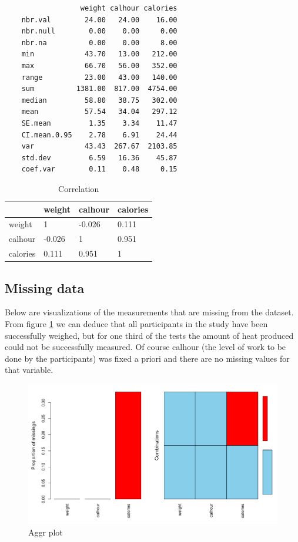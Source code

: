 \documentclass[11pt, a4paper]{article}
\begin{document}
\begin{verbatim}
                  weight calhour calories
    nbr.val        24.00   24.00    16.00
    nbr.null        0.00    0.00     0.00
    nbr.na          0.00    0.00     8.00
    min            43.70   13.00   212.00
    max            66.70   56.00   352.00
    range          23.00   43.00   140.00
    sum          1381.00  817.00  4754.00
    median         58.80   38.75   302.00
    mean           57.54   34.04   297.12
    SE.mean         1.35    3.34    11.47
    CI.mean.0.95    2.78    6.91    24.44
    var            43.43  267.67  2103.85
    std.dev         6.59   16.36    45.87
    coef.var        0.11    0.48     0.15
\end{verbatim}


\begin{table}[H]
    \centering
    \begin{tabular}{l|l|l|l|}
    \cline{2-4}
                                   & weight & calhour & calories \\ \hline
    \multicolumn{1}{|l|}{weight}   & 1      & -0.026  & 0.111    \\ \hline
    \multicolumn{1}{|l|}{calhour}  & -0.026 & 1       & 0.951    \\ \hline
    \multicolumn{1}{|l|}{calories} & 0.111  & 0.951   & 1        \\ \hline
    \end{tabular}
    \caption{Correlation}    
\end{table}
\subsection{Missing data} \label{missing}

Below are visualizations of the measurements that are missing from the
dataset. From figure \ref{fig:aggrplot} we can deduce that all
participants in the study have been successfully weighed, but for one
third of the tests the amount of heat produced could not be
successfully measured. Of course calhour (the level of work to be done
by the participants) was fixed a priori and there are no missing
values for that variable.

\begin{figure}[H]
    \centering
    \includegraphics[scale=.4]{aggr.png}
    \caption{Aggr plot}
    \label{fig:aggrplot}
\end{figure}
\end{document}

